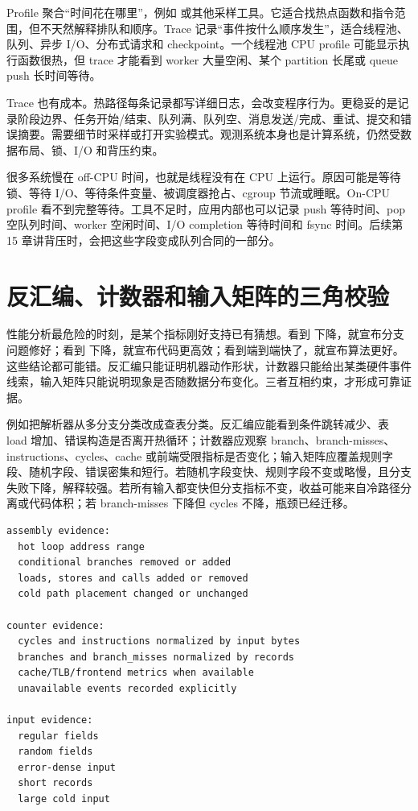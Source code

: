 Profile 聚合“时间花在哪里”，例如  或其他采样工具。它适合找热点函数和指令范围，但不天然解释排队和顺序。Trace 记录“事件按什么顺序发生”，适合线程池、队列、异步 I/O、分布式请求和 checkpoint。一个线程池 CPU profile 可能显示执行函数很热，但 trace 才能看到 worker 大量空闲、某个 partition 长尾或 queue push 长时间等待。

Trace 也有成本。热路径每条记录都写详细日志，会改变程序行为。更稳妥的是记录阶段边界、任务开始/结束、队列满、队列空、消息发送/完成、重试、提交和错误摘要。需要细节时采样或打开实验模式。观测系统本身也是计算系统，仍然受数据布局、锁、I/O 和背压约束。

很多系统慢在 off-CPU 时间，也就是线程没有在 CPU 上运行。原因可能是等待锁、等待 I/O、等待条件变量、被调度器抢占、cgroup 节流或睡眠。On-CPU profile 看不到完整等待。工具不足时，应用内部也可以记录 push 等待时间、pop 空队列时间、worker 空闲时间、I/O completion 等待时间和 fsync 时间。后续第 15 章讲背压时，会把这些字段变成队列合同的一部分。

\section{反汇编、计数器和输入矩阵的三角校验}

性能分析最危险的时刻，是某个指标刚好支持已有猜想。看到  下降，就宣布分支问题修好；看到  下降，就宣布代码更高效；看到端到端快了，就宣布算法更好。这些结论都可能错。反汇编只能证明机器动作形状，计数器只能给出某类硬件事件线索，输入矩阵只能说明现象是否随数据分布变化。三者互相约束，才形成可靠证据。

例如把解析器从多分支分类改成查表分类。反汇编应能看到条件跳转减少、表 load 增加、错误构造是否离开热循环；计数器应观察 branch、branch-misses、instructions、cycles、cache 或前端受限指标是否变化；输入矩阵应覆盖规则字段、随机字段、错误密集和短行。若随机字段变快、规则字段不变或略慢，且分支失败下降，解释较强。若所有输入都变快但分支指标不变，收益可能来自冷路径分离或代码体积；若 branch-misses 下降但 cycles 不降，瓶颈已经迁移。

\begin{lstlisting}[numbers=none,caption={三角校验的最小材料}]
assembly evidence:
  hot loop address range
  conditional branches removed or added
  loads, stores and calls added or removed
  cold path placement changed or unchanged

counter evidence:
  cycles and instructions normalized by input bytes
  branches and branch_misses normalized by records
  cache/TLB/frontend metrics when available
  unavailable events recorded explicitly

input evidence:
  regular fields
  random fields
  error-dense input
  short records
  large cold input
\end{lstlisting}

